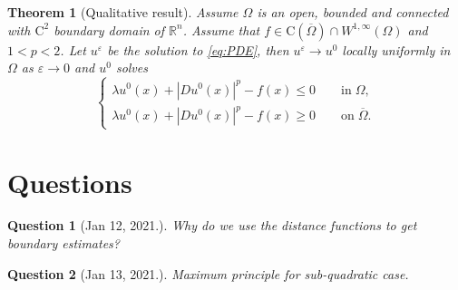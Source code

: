 \documentclass[11pt,reqno]{amsart}
\numberwithin{figure}{section}
\theoremstyle{plain}
\newtheorem{thm}{Theorem}[section]
\newtheorem{quest}{Question}
\theoremstyle{remark}
\numberwithin{equation}{section}
\begin{document}
\begin{thm}[Qualitative result] Assume $\Omega$ is an open, bounded and connected with $\mathrm{C}^2$ boundary domain of $\mathbb{R}^n$. Assume that $f\in \mathrm{C}(\overline{\Omega})\cap W^{1,\infty}(\Omega)$ and $1<p<2$. Let $u^\varepsilon$ be the solution to \eqref{eq:PDE}, then $u^\varepsilon \rightarrow u^0$ locally uniformly in $\Omega$ as $\varepsilon\rightarrow 0$ and $u^0$ solves
\begin{equation}\label{eq:PDE0}
    \begin{cases}
    \lambda u^0(x) + |Du^0(x)|^p - f(x)\leq  0 \qquad\text{in}\;\Omega, \\
    \lambda u^0(x) + |Du^0(x)|^p - f(x)\geq  0 \qquad\text{on}\;\overline{\Omega}.
    \end{cases}
\end{equation}
\end{thm}










\section{Questions}
\begin{quest} [Jan 12, 2021.] Why do we use the distance functions to get boundary estimates? 
\end{quest}

\begin{quest} [Jan 13, 2021.] Maximum principle for sub-quadratic case.
\end{quest}
\end{document}

